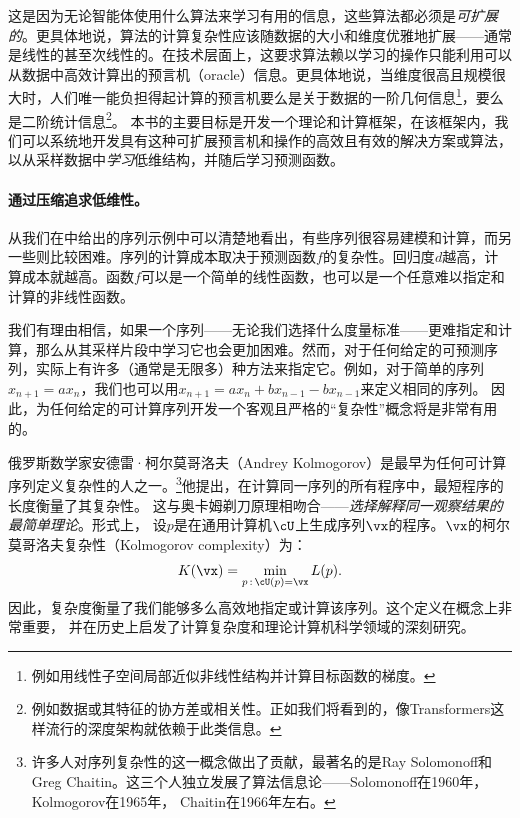 \documentclass[../../book-main_zh.tex]{subfiles}
\begin{document}
这是因为无论智能体使用什么算法来学习有用的信息，这些算法都必须是\textit{可扩展的}。更具体地说，算法的计算复杂性应该随数据的大小和维度优雅地扩展——通常是线性的甚至次线性的。在技术层面上，这要求算法赖以学习的操作只能利用可以从数据中高效计算出的预言机（oracle）信息。更具体地说，当维度很高且规模很大时，人们唯一能负担得起计算的预言机要么是关于数据的一阶几何信息\footnote{例如用线性子空间局部近似非线性结构并计算目标函数的梯度。}，要么是二阶统计信息\footnote{例如数据或其特征的协方差或相关性。正如我们将看到的，像Transformers这样流行的深度架构就依赖于此类信息。}。
本书的主要目标是开发一个理论和计算框架，在该框架内，我们可以系统地开发具有这种可扩展预言机和操作的高效且有效的解决方案或算法，以从采样数据中\textit{学习}低维结构，并随后学习预测函数。

\paragraph{通过压缩追求低维性。}
从我们在中给出的序列示例中可以清楚地看出，有些序列很容易建模和计算，而另一些则比较困难。序列的计算成本取决于预测函数\(f\)的复杂性。回归度\(d\)越高，计算成本就越高。函数\(f\)可以是一个简单的线性函数，也可以是一个任意难以指定和计算的非线性函数。

我们有理由相信，如果一个序列——无论我们选择什么度量标准——更难指定和计算，那么从其采样片段中学习它也会更加困难。然而，对于任何给定的可预测序列，实际上有许多（通常是无限多）种方法来指定它。例如，对于简单的序列\(x_{n+1}
= a x_{n}\)，我们也可以用\(x_{n+1} = a x_{n} + b x_{n-1} - b x_{n-1}\)来定义相同的序列。
因此，为任何给定的可计算序列开发一个客观且严格的“复杂性”概念将是非常有用的。

俄罗斯数学家安德雷·柯尔莫哥洛夫（Andrey
Kolmogorov）是最早为任何可计算序列定义复杂性的人之一。\footnote{许多人对序列复杂性的这一概念做出了贡献，最著名的是Ray
    Solomonoff和Greg
Chaitin。这三个人独立发展了算法信息论——Solomonoff在1960年，Kolmogorov在1965年\cite{Kolmogorov1998OnTO}，
Chaitin在1966年左右\cite{Chaitin-1966}。}他提出，在计算同一序列的所有程序中，最短程序的长度衡量了其复杂性。
这与奥卡姆剃刀原理相吻合——\textit{选择解释同一观察结果的最简单理论}。形式上，
设\(p\)是在通用计算机\(\cU\)上生成序列\(\vx\)的程序。\(\vx\)的柯尔莫哥洛夫复杂性（Kolmogorov
complexity）为：
\begin{equation}
        K(\vx) = \min_{p\,:\, \cU(p) = \vx} L(p).
\end{equation}
因此，复杂度衡量了我们能够多么高效地指定或计算该序列。这个定义在概念上非常重要，
并在历史上启发了计算复杂度和理论计算机科学领域的深刻研究。
\end{document}
